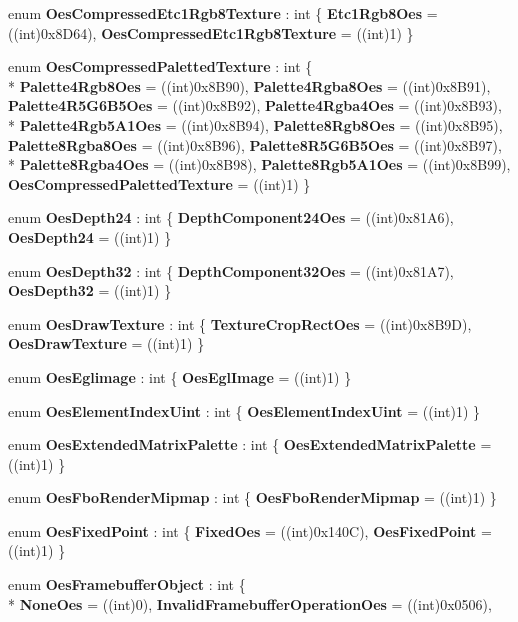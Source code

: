 \begin{DoxyCompactItemize}
enum {\bfseries Oes\-Compressed\-Etc1\-Rgb8\-Texture} \-: int \{ {\bfseries Etc1\-Rgb8\-Oes} = ((int)0x8\-D64), 
{\bfseries Oes\-Compressed\-Etc1\-Rgb8\-Texture} = ((int)1)
 \}
\item 
enum {\bfseries Oes\-Compressed\-Paletted\-Texture} \-: int \{ \\*
{\bfseries Palette4\-Rgb8\-Oes} = ((int)0x8\-B90), 
{\bfseries Palette4\-Rgba8\-Oes} = ((int)0x8\-B91), 
{\bfseries Palette4\-R5\-G6\-B5\-Oes} = ((int)0x8\-B92), 
{\bfseries Palette4\-Rgba4\-Oes} = ((int)0x8\-B93), 
\\*
{\bfseries Palette4\-Rgb5\-A1\-Oes} = ((int)0x8\-B94), 
{\bfseries Palette8\-Rgb8\-Oes} = ((int)0x8\-B95), 
{\bfseries Palette8\-Rgba8\-Oes} = ((int)0x8\-B96), 
{\bfseries Palette8\-R5\-G6\-B5\-Oes} = ((int)0x8\-B97), 
\\*
{\bfseries Palette8\-Rgba4\-Oes} = ((int)0x8\-B98), 
{\bfseries Palette8\-Rgb5\-A1\-Oes} = ((int)0x8\-B99), 
{\bfseries Oes\-Compressed\-Paletted\-Texture} = ((int)1)
 \}
\item 
enum {\bfseries Oes\-Depth24} \-: int \{ {\bfseries Depth\-Component24\-Oes} = ((int)0x81\-A6), 
{\bfseries Oes\-Depth24} = ((int)1)
 \}
\item 
enum {\bfseries Oes\-Depth32} \-: int \{ {\bfseries Depth\-Component32\-Oes} = ((int)0x81\-A7), 
{\bfseries Oes\-Depth32} = ((int)1)
 \}
\item 
enum {\bfseries Oes\-Draw\-Texture} \-: int \{ {\bfseries Texture\-Crop\-Rect\-Oes} = ((int)0x8\-B9\-D), 
{\bfseries Oes\-Draw\-Texture} = ((int)1)
 \}
\item 
enum {\bfseries Oes\-Eglimage} \-: int \{ {\bfseries Oes\-Egl\-Image} = ((int)1)
 \}
\item 
enum {\bfseries Oes\-Element\-Index\-Uint} \-: int \{ {\bfseries Oes\-Element\-Index\-Uint} = ((int)1)
 \}
\item 
enum {\bfseries Oes\-Extended\-Matrix\-Palette} \-: int \{ {\bfseries Oes\-Extended\-Matrix\-Palette} = ((int)1)
 \}
\item 
enum {\bfseries Oes\-Fbo\-Render\-Mipmap} \-: int \{ {\bfseries Oes\-Fbo\-Render\-Mipmap} = ((int)1)
 \}
\item 
enum {\bfseries Oes\-Fixed\-Point} \-: int \{ {\bfseries Fixed\-Oes} = ((int)0x140\-C), 
{\bfseries Oes\-Fixed\-Point} = ((int)1)
 \}
\item 
enum {\bfseries Oes\-Framebuffer\-Object} \-: int \{ \\*
{\bfseries None\-Oes} = ((int)0), 
{\bfseries Invalid\-Framebuffer\-Operation\-Oes} = ((int)0x0506), 

\end{DoxyCompactItemize}
